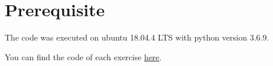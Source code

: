 \section*{Prerequisite}
The code was executed on ubuntu 18.04.4 LTS with python version 3.6.9.

You can find the code of each exercise \href{https://github.com/alla1101/PythonHardWay}{here}.